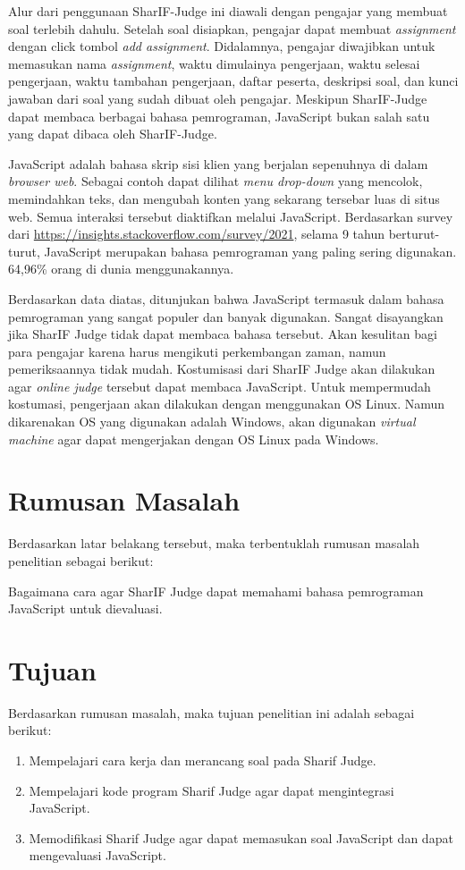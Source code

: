 Alur dari penggunaan SharIF-Judge ini diawali dengan pengajar yang membuat soal terlebih dahulu. Setelah soal disiapkan, pengajar dapat membuat \textit{assignment} dengan click tombol \textit{add assignment}. Didalamnya, pengajar diwajibkan untuk memasukan nama \textit{assignment}, waktu dimulainya pengerjaan, waktu selesai pengerjaan, waktu tambahan pengerjaan, daftar peserta, deskripsi soal, dan kunci jawaban dari soal yang sudah dibuat oleh pengajar. Meskipun SharIF-Judge dapat membaca berbagai bahasa pemrograman, JavaScript bukan salah satu yang dapat dibaca oleh SharIF-Judge.

JavaScript adalah bahasa skrip sisi klien yang berjalan sepenuhnya di dalam \textit{browser web}\cite{javascript101}. Sebagai contoh dapat dilihat \textit{menu drop-down} yang mencolok, memindahkan teks, dan mengubah konten yang sekarang tersebar luas di situs web. Semua interaksi tersebut diaktifkan melalui JavaScript. Berdasarkan survey dari \url{https://insights.stackoverflow.com/survey/2021}, selama 9 tahun berturut-turut, JavaScript merupakan bahasa pemrograman yang paling sering digunakan. 64,96\% orang di dunia menggunakannya.

Berdasarkan data diatas, ditunjukan bahwa JavaScript termasuk dalam bahasa pemrograman yang sangat populer dan banyak digunakan. Sangat disayangkan jika SharIF Judge tidak dapat membaca bahasa tersebut. Akan kesulitan bagi para pengajar karena harus mengikuti perkembangan zaman, namun pemeriksaannya tidak mudah. Kostumisasi dari SharIF Judge akan dilakukan agar \textit{online judge} tersebut dapat membaca JavaScript. Untuk mempermudah kostumasi, pengerjaan akan dilakukan dengan menggunakan OS Linux. Namun dikarenakan OS yang digunakan adalah Windows, akan digunakan \textit{virtual machine} agar dapat mengerjakan dengan OS Linux pada Windows. 


\section{Rumusan Masalah}
\label{sec:rumusan}
Berdasarkan latar belakang tersebut, maka terbentuklah rumusan masalah penelitian sebagai berikut: 

     Bagaimana cara agar SharIF Judge dapat memahami bahasa pemrograman JavaScript untuk dievaluasi.



\section{Tujuan}
\label{sec:tujuan}
Berdasarkan rumusan masalah, maka tujuan penelitian ini adalah sebagai berikut:
\begin{enumerate}
    \item Mempelajari cara kerja dan merancang soal pada Sharif Judge.
    \item Mempelajari kode program Sharif Judge agar dapat mengintegrasi JavaScript.
    \item Memodifikasi Sharif Judge agar dapat memasukan soal JavaScript dan dapat mengevaluasi JavaScript.
\end{enumerate}


